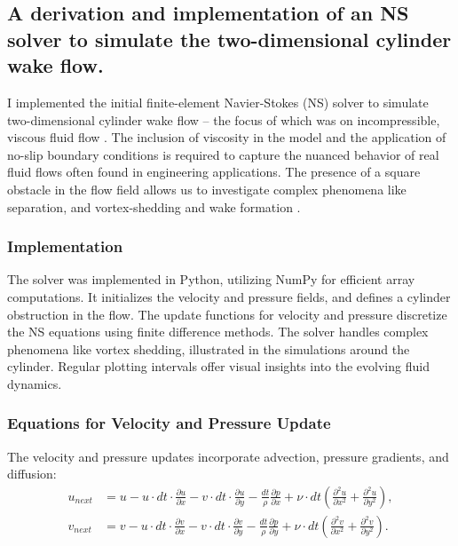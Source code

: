 \subsection{A derivation and implementation of an NS solver to simulate the two-dimensional cylinder wake flow.}

I implemented the initial finite-element Navier-Stokes (NS) solver \cite{Batchelor2000} to simulate two-dimensional cylinder wake flow -- the focus of which was on incompressible, viscous fluid flow \cite{Pope2000}. The inclusion of viscosity in the model and the application of no-slip boundary conditions \cite{White2006} is required to capture the nuanced behavior of real fluid flows often found in engineering applications. The presence of a square obstacle in the flow field allows us to investigate complex phenomena like separation, and vortex-shedding and wake formation \cite{Zdravkovich1997,Anderson1995}.

\subsubsection{Implementation}
The solver was implemented in Python, utilizing NumPy for efficient array computations. It initializes the velocity and pressure fields, and defines a cylinder obstruction in the flow. The update functions for velocity and pressure discretize the NS equations using finite difference methods. The solver handles complex phenomena like vortex shedding, illustrated in the simulations around the cylinder. Regular plotting intervals offer visual insights into the evolving fluid dynamics.

\subsubsection{Equations for Velocity and Pressure Update}
The velocity and pressure updates incorporate advection, pressure gradients, and diffusion:
\begin{align}
    u_{next} &= u - u \cdot dt \cdot \frac{\partial u}{\partial x} - v \cdot dt \cdot \frac{\partial u}{\partial y} - \frac{dt}{\rho} \frac{\partial p}{\partial x} + \nu \cdot dt \left( \frac{\partial^2 u}{\partial x^2} + \frac{\partial^2 u}{\partial y^2} \right), \\
    v_{next} &= v - u \cdot dt \cdot \frac{\partial v}{\partial x} - v \cdot dt \cdot \frac{\partial v}{\partial y} - \frac{dt}{\rho} \frac{\partial p}{\partial y} + \nu \cdot dt \left( \frac{\partial^2 v}{\partial x^2} + \frac{\partial^2 v}{\partial y^2} \right).
\end{align}

